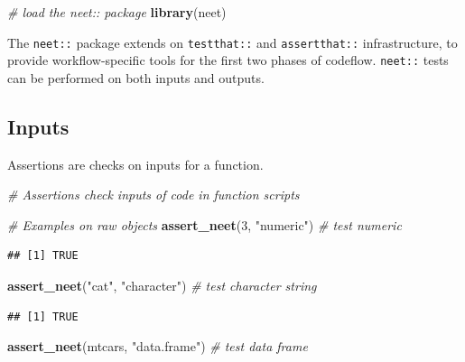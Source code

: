 \documentclass[
]{article}
\newenvironment{Shaded}{\begin{snugshade}}{\end{snugshade}}
\newcommand{\CommentTok}[1]{\textcolor[rgb]{0.56,0.35,0.01}{\textit{#1}}}
\newcommand{\DecValTok}[1]{\textcolor[rgb]{0.00,0.00,0.81}{#1}}
\newcommand{\KeywordTok}[1]{\textcolor[rgb]{0.13,0.29,0.53}{\textbf{#1}}}
\newcommand{\NormalTok}[1]{#1}
\newcommand{\StringTok}[1]{\textcolor[rgb]{0.31,0.60,0.02}{#1}}
\begin{document}
\begin{Shaded}
\begin{Highlighting}[]
\CommentTok{\# load the neet:: package}
\KeywordTok{library}\NormalTok{(neet)}
\end{Highlighting}
\end{Shaded}

The \texttt{neet::} package extends on \texttt{testthat::} and \texttt{assertthat::} infrastructure, to provide workflow-specific tools for the first two phases of codeflow. \texttt{neet::} tests can be performed on both inputs and outputs.

\hypertarget{inputs}{%
\subsection{Inputs}\label{inputs}}

Assertions are checks on inputs for a function.

\begin{Shaded}
\begin{Highlighting}[]
\CommentTok{\# Assertions check inputs of code in function scripts}

\CommentTok{\# Examples on raw objects}
\KeywordTok{assert\_neet}\NormalTok{(}\DecValTok{3}\NormalTok{, }\StringTok{"numeric"}\NormalTok{) }\CommentTok{\# test numeric}
\end{Highlighting}
\end{Shaded}

\begin{verbatim}
## [1] TRUE
\end{verbatim}

\begin{Shaded}
\begin{Highlighting}[]
\KeywordTok{assert\_neet}\NormalTok{(}\StringTok{"cat"}\NormalTok{, }\StringTok{"character"}\NormalTok{) }\CommentTok{\# test character string}
\end{Highlighting}
\end{Shaded}

\begin{verbatim}
## [1] TRUE
\end{verbatim}

\begin{Shaded}
\begin{Highlighting}[]
\KeywordTok{assert\_neet}\NormalTok{(mtcars, }\StringTok{"data.frame"}\NormalTok{) }\CommentTok{\# test data frame}
\end{Highlighting}
\end{Shaded}
\end{document}
